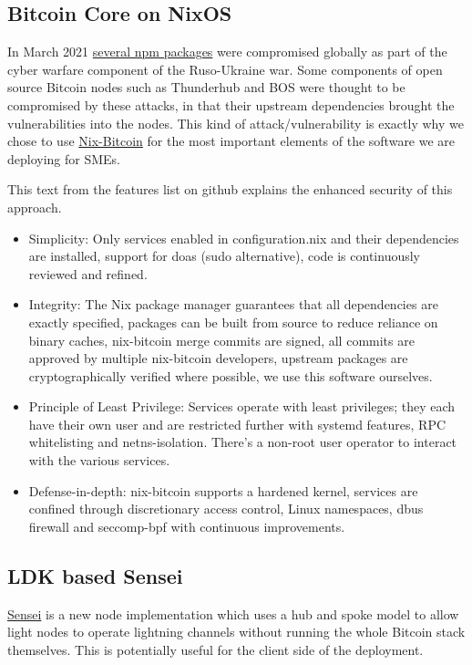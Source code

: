 \subsection{Bitcoin Core on NixOS}
In March 2021 \href{https://www.whitesourcesoftware.com/whitesource-npm-threat-report-for-javascript-package-registry/}{several npm packages} were compromised globally as part of the cyber warfare component of the Ruso-Ukraine war. Some components of open source Bitcoin nodes such as Thunderhub and BOS were thought to be compromised by these attacks, in that their upstream dependencies brought the vulnerabilities into the nodes. This kind of attack/vulnerability is exactly why we chose to use \href{https://github.com/fort-nix/nix-bitcoin/#features}{Nix-Bitcoin} for the most important elements of the software we are deploying for SMEs.\par
This text from the features list on github explains the enhanced security of this approach.
\begin{itemize}
\item Simplicity: Only services enabled in configuration.nix and their dependencies are installed, support for doas (sudo alternative), code is continuously reviewed and refined.
\item Integrity: The Nix package manager guarantees that all dependencies are exactly specified, packages can be built from source to reduce reliance on binary caches, nix-bitcoin merge commits are signed, all commits are approved by multiple nix-bitcoin developers, upstream packages are cryptographically verified where possible, we use this software ourselves.
\item Principle of Least Privilege: Services operate with least privileges; they each have their own user and are restricted further with systemd features, RPC whitelisting and netns-isolation. There's a non-root user operator to interact with the various services.
\item Defense-in-depth: nix-bitcoin supports a hardened kernel, services are confined through discretionary access control, Linux namespaces, dbus firewall and seccomp-bpf with continuous improvements.
\end{itemize}
\subsection{LDK based Sensei}
\href{https://l2.technology/sensei}{Sensei} is a new node implementation which uses a hub and spoke model to allow light nodes to operate lightning channels without running the whole Bitcoin stack themselves. This is potentially useful for the client side of the deployment.
